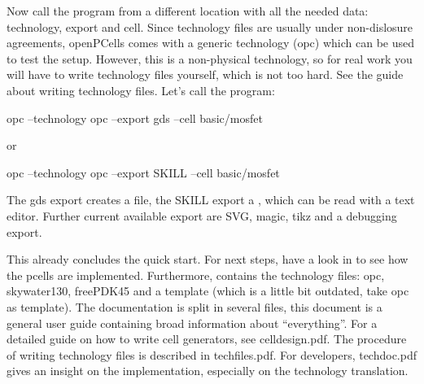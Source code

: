 Now call the program from a different location with all the needed data: technology, export and cell.
Since technology files are usually under non-dislosure agreements, openPCells comes with a generic technology (opc) which can be used to test the
setup.
However, this is a non-physical technology, so for real work you will have to write technology files yourself, which is not too hard.
See the guide about writing technology files.
Let's call the program: \begin{shellcode}
    opc --technology opc --export gds --cell basic/mosfet
\end{shellcode}
or
\begin{shellcode}
    opc --technology opc --export SKILL --cell basic/mosfet
\end{shellcode}
The gds export creates a  file, the SKILL export a , which can be read with a text editor.
Further current available export are SVG, magic, tikz and a debugging export.

This already concludes the quick start.
For next steps, have a look in  to see how the pcells are implemented.
Furthermore,  contains the technology files: opc, skywater130, freePDK45 and a template (which is a little bit outdated, take opc as template).
The documentation is split in several files, this document is a general user guide containing broad information about \enquote{everything}.
For a detailed guide on how to write cell generators, see celldesign.pdf.
The procedure of writing technology files is described in techfiles.pdf.
For developers, techdoc.pdf gives an insight on the implementation, especially on the technology translation.

